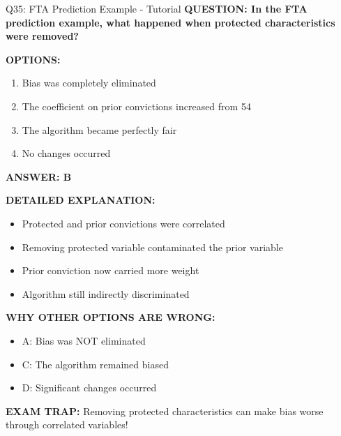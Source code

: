 \documentclass[8pt]{beamer}
\begin{document}
	\begin{frame}{Q35: FTA Prediction Example - Tutorial}
		\fontsize{6.5}{7.5}\selectfont
		\textbf{QUESTION: In the FTA prediction example, what happened when protected characteristics were removed?}
		
		\vspace{0.1cm}
		\textbf{OPTIONS:}
		\begin{enumerate}
			\item Bias was completely eliminated
			\item The coefficient on prior convictions increased from 54%
			\item The algorithm became perfectly fair
			\item No changes occurred
		\end{enumerate}
		
		\vspace{0.1cm}
		\textcolor{myblue}{\textbf{ANSWER: B}}
		
		\vspace{0.1cm}
		\textbf{DETAILED EXPLANATION:}
		\begin{itemize}
			\item Protected and prior convictions were correlated
			\item Removing protected variable contaminated the prior variable
			\item Prior conviction now carried more weight
			\item Algorithm still indirectly discriminated
		\end{itemize}
		
		\vspace{0.1cm}
		\textcolor{myred}{\textbf{WHY OTHER OPTIONS ARE WRONG:}}
		\begin{itemize}
			\item \textcolor{myred}{A:} Bias was NOT eliminated
			\item \textcolor{myred}{C:} The algorithm remained biased
			\item \textcolor{myred}{D:} Significant changes occurred
		\end{itemize}
		
		\textcolor{myred}{\textbf{EXAM TRAP:}} Removing protected characteristics \textcolor{myblue}{can make bias worse} through correlated variables!
	\end{frame}
	
\end{document}
